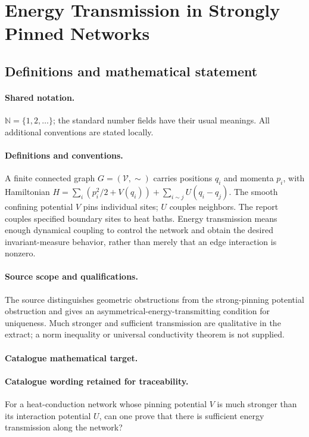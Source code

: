 \documentclass[11pt]{article}
\begin{document}
\section{Energy Transmission in Strongly Pinned Networks}\label{statement}

\subsection{Definitions and mathematical statement}

\paragraph{Shared notation.}$\mathbb N=\{1,2,\ldots\}$; the standard number fields have their usual meanings. All additional conventions are stated locally.


\paragraph{Definitions and conventions.} A finite connected graph $G=(\mathcal V,\sim)$ carries positions $q_i$ and momenta $p_i$, with Hamiltonian $H=\sum_i(p_i^2/2+V(q_i))+\sum_{i\sim j}U(q_i-q_j)$. The smooth confining potential $V$ pins individual sites; $U$ couples neighbors. The report couples specified boundary sites to heat baths. Energy transmission means enough dynamical coupling to control the network and obtain the desired invariant-measure behavior, rather than merely that an edge interaction is nonzero.

\paragraph{Source scope and qualifications.} The source distinguishes geometric obstructions from the strong-pinning potential obstruction and gives an asymmetrical-energy-transmitting condition for uniqueness. Much stronger and sufficient transmission are qualitative in the extract; a norm inequality or universal conductivity theorem is not supplied.

\paragraph{Catalogue mathematical target.}
\paragraph{Catalogue wording retained for traceability.}
For a heat-conduction network whose pinning potential $V$ is much stronger than its interaction potential $U$, can one prove that there is sufficient energy transmission along the network?
\end{document}
